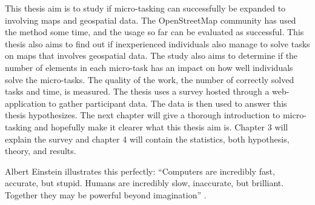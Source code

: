 This thesis aim is to study if micro-tasking can successfully be expanded to involving maps and geospatial data. The OpenStreetMap community has used the method some time, and the usage so far can be evaluated as successful. %
This thesis also aims to find out if inexperienced individuals also manage to solve tasks on maps that involves geospatial data. The study also aims to determine if the number of elements in each micro-task has an impact on how well individuals solve the micro-tasks. The quality of the work, the number of correctly solved tasks and time, is measured. The thesis uses a survey hosted through a web-application to gather participant data. The data is then used to answer this thesis hypothesizes. The next chapter will give a thorough introduction to micro-tasking and hopefully make it clearer what this thesis aim is. Chapter 3 will explain the survey and chapter 4 will contain the statistics, both hypothesis, theory, and results. 



Albert Einstein illustrates this perfectly: “Computers are incredibly fast, accurate, but stupid. Humans are incredibly slow, inaccurate, but brilliant. Together they may be powerful beyond imagination” \citep{Holzinger2013}. 